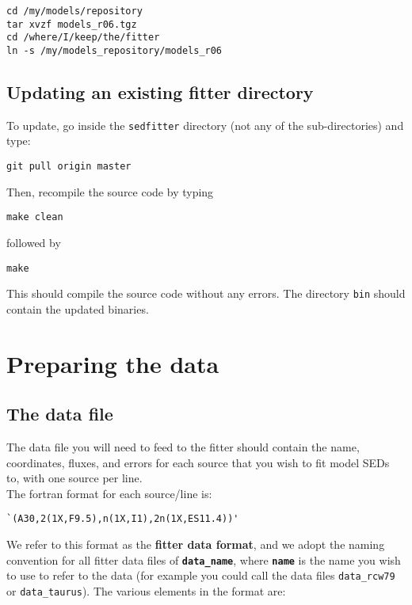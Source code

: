 \documentclass[letterpaper,11pt]{report}
\begin{document}
\begin{verbatim}
cd /my/models/repository
tar xvzf models_r06.tgz
cd /where/I/keep/the/fitter
ln -s /my/models_repository/models_r06
\end{verbatim}

\section{Updating an existing fitter directory}

To update, go inside the \texttt{sedfitter} directory (not any of the sub-directories) and type:

\begin{verbatim}
git pull origin master
\end{verbatim}

Then, recompile the source code by typing
\begin{verbatim}
make clean
\end{verbatim}
followed by
\begin{verbatim}
make
\end{verbatim} 
This should compile the source code without any errors. The directory \texttt{bin} should contain the updated binaries.

\chapter{Preparing the data}

\section{The data file}
\label{s:dataconvert}

The data file you will need to feed to the fitter should contain the name, coordinates, fluxes, and errors for each source that you wish to fit model SEDs to, with one source per line.\\

The fortran format for each source/line is:

\begin{verbatim}
`(A30,2(1X,F9.5),n(1X,I1),2n(1X,ES11.4))'
\end{verbatim}

We refer to this format as the {\bf fitter data format}, and we adopt the naming convention for all fitter data files of \texttt{\bf data\_name}, where \texttt{\bf name} is the name you wish to use to refer to the data (for example you could call the data files \texttt{data\_rcw79} or \texttt{data\_taurus}). The various elements in the format are:
\end{document}
